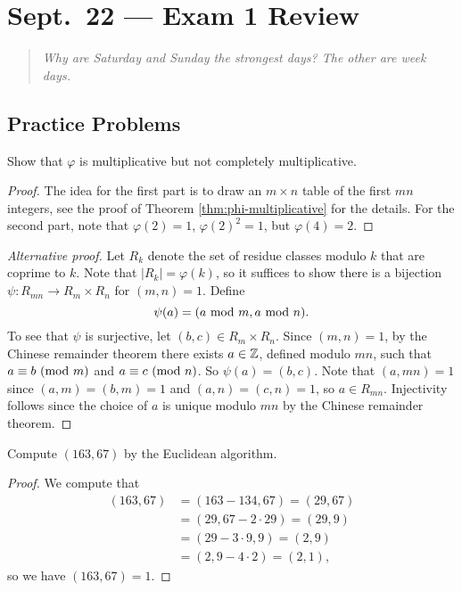 \chapter{Sept.~22 --- Exam 1 Review}

\begin{quote}
  \emph{Why are Saturday and Sunday the
  strongest days? The other
  are week days.}
\end{quote}

\section{Practice Problems}

\begin{exercise}
  Show that $\varphi$ is multiplicative
  but not completely multiplicative.
\end{exercise}

\begin{proof}
  The idea for the first part is to
  draw an $m \times n$ table of the
  first $mn$ integers,
  see the proof of Theorem
  \ref{thm:phi-multiplicative} for
  the details.
  For the second part,
  note that
  $\varphi(2) = 1$, $\varphi(2)^2 = 1$,
  but $\varphi(4) = 2$.
\end{proof}

\begin{proof}[Alternative proof]
  Let $R_k$ denote the set of residue
  classes modulo $k$ that are coprime
  to $k$.
  Note that $|R_k| = \varphi(k)$, so
  it suffices to show there is a
  bijection $\psi : R_{mn} \to R_m \times R_n$
  for $(m, n) = 1$.
  Define
  \[\psi(a) = (a \ {\mathrm{mod}\ m}, a \ {\mathrm{mod}\ n}).\]
  To see that $\psi$ is surjective,
  let $(b, c) \in R_m \times R_n$. Since
  $(m, n) = 1$, by
  the Chinese remainder theorem there
  exists $a \in \mathbb{Z}$, defined modulo
  $mn$, such that
  $a \equiv b \ (\mathrm{mod}\ m)$ and
  $a \equiv c \ (\mathrm{mod}\ n)$.
  So $\psi(a) = (b, c)$. Note that
  $(a, mn) = 1$ since
  $(a, m) = (b, m) = 1$
  and $(a, n) = (c, n) = 1$, so
  $a \in R_{mn}$.
  Injectivity follows
  since the choice of
  $a$ is unique modulo $mn$ by
  the Chinese remainder theorem.
\end{proof}

\begin{exercise}
  Compute $(163, 67)$ by the Euclidean
  algorithm.
\end{exercise}

\begin{proof}
  We compute that
  \begin{align*}
  (163, 67)
  &= (163 - 134, 67) = (29, 67) \\
  &= (29, 67 - 2 \cdot 29) = (29, 9) \\
  &= (29 - 3 \cdot 9, 9) = (2, 9) \\
  &= (2, 9 - 4 \cdot 2) = (2, 1),
  \end{align*}
  so we have $(163, 67) = 1$.
\end{proof}

